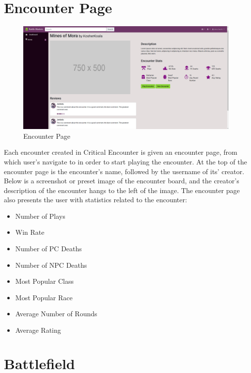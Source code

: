 \documentclass[12pt,a4paper]{report}
\begin{document}
	\section{Encounter Page}
	\begin{figure}[!h]
		\centering
		\includegraphics[scale=.20]{encounter}
		\caption{Encounter Page}
		\label{fig: Encounter Page}
	\end{figure}
	Each encounter created in Critical Encounter is given an encounter page, from which user's navigate to in order to start playing the encounter. At the top of the encounter page is the encounter's name, followed by the username of its' creator. Below is a screenshot or preset image of the encounter board, and the creator's description of the encounter hangs to the left of the image. The encounter page also presents the user with statistics related to the encounter:
	\begin{multicols}{2}
		\begin{itemize}
			\item Number of Plays
			\item Win Rate
			\item Number of PC Deaths
			\item Number of NPC Deaths
			\item Most Popular Class
			\item Most Popular Race
			\item Average Number of Rounds
			\item Average Rating
		\end{itemize}
	\end{multicols}
	\newpage
	\section{Battlefield}
	\lipsum[3]
	\newpage
\end{document}

